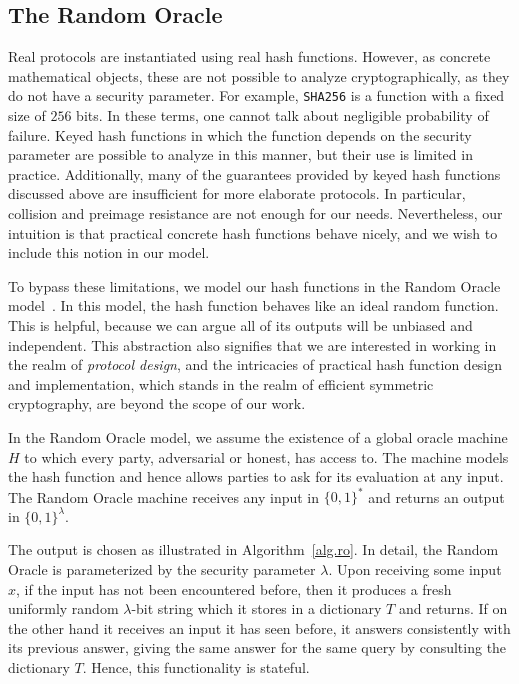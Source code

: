 \subsection{The Random Oracle}

Real protocols are instantiated using real hash functions. However, as concrete
mathematical objects, these are not possible to analyze cryptographically, as
they do not have a security parameter. For example, \texttt{SHA256} is a
function with a fixed size of $256$ bits. In these terms, one cannot talk about
negligible probability of failure. Keyed hash functions in which the function
depends on the security parameter are possible to analyze in this manner, but
their use is limited in practice. Additionally, many of the guarantees provided
by keyed hash functions discussed above are insufficient for more elaborate
protocols. In particular, collision and preimage resistance are not enough for
our needs. Nevertheless, our intuition is that practical concrete hash functions
behave nicely, and we wish to include this notion in our model.

To bypass these limitations, we model our hash functions in the Random Oracle
model~\cite{ro}. In this model, the hash function behaves like an ideal random
function. This is helpful, because we can argue all of its outputs will be
unbiased and independent. This abstraction also signifies that we are interested
in working in the realm of \emph{protocol design}, and the intricacies of
practical hash function design and implementation, which stands in the realm of
efficient symmetric cryptography, are beyond the scope of our work.

In the Random Oracle model, we assume the existence of a global oracle machine
$H$ to which every party, adversarial or honest, has access to. The machine
models the hash function and hence allows parties to ask for its evaluation at
any input. The Random Oracle machine receives any input in $\{0, 1\}^*$ and
returns an output in $\{0, 1\}^\lambda$.



The output is chosen as illustrated in Algorithm~\ref{alg.ro}. In detail, the
Random Oracle is parameterized by the security parameter $\lambda$. Upon
receiving some input $x$, if the input has not been encountered before, then it
produces a fresh uniformly random $\lambda$-bit string which it stores in a
dictionary $T$ and returns. If on the other hand it receives an input it has
seen before, it answers consistently with its previous answer, giving the same
answer for the same query by consulting the dictionary $T$. Hence, this
functionality is stateful.


